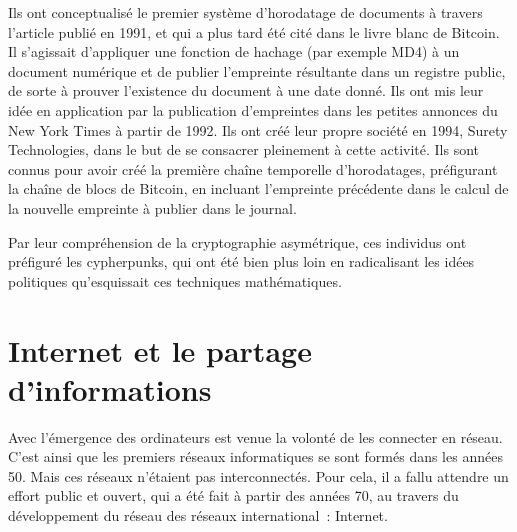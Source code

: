 Ils ont conceptualisé le premier système d'horodatage de documents à travers l'article  publié en 1991, et qui a plus tard été cité dans le livre blanc de Bitcoin. Il s'agissait d'appliquer une fonction de hachage (par exemple MD4) à un document numérique et de publier l'empreinte résultante dans un registre public, de sorte à prouver l'existence du document à une date donné. Ils ont mis leur idée en application par la publication d'empreintes dans les petites annonces du New York Times à partir de 1992. Ils ont créé leur propre société en 1994, Surety Technologies, dans le but de se consacrer pleinement à cette activité. Ils sont connus pour avoir créé la première chaîne temporelle d'horodatages, préfigurant la chaîne de blocs de Bitcoin, en incluant l'empreinte précédente dans le calcul de la nouvelle empreinte à publier dans le journal.

Par leur compréhension de la cryptographie asymétrique, ces individus ont préfiguré les cypherpunks, qui ont été bien plus loin en radicalisant les idées politiques qu'esquissait ces techniques mathématiques.

\section*{Internet et le partage d'informations}


Avec l'émergence des ordinateurs est venue la volonté de les connecter en réseau. C'est ainsi que les premiers réseaux informatiques se sont formés dans les années 50. Mais ces réseaux n'étaient pas interconnectés. Pour cela, il a fallu attendre un effort public et ouvert, qui a été fait à partir des années 70, au travers du développement du réseau des réseaux international~: Internet.

